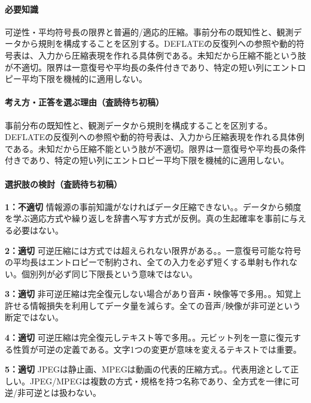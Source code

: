 \paragraph{必要知識} 可逆性・平均符号長の限界と普遍的/適応的圧縮。事前分布の既知性と、観測データから規則を構成することを区別する。DEFLATEの反復列への参照や動的符号表は、入力から圧縮表現を作れる具体例である。未知だから圧縮不能という肢が不適切。限界は一意復号や平均長の条件付きであり、特定の短い列にエントロピー平均下限を機械的に適用しない。

\paragraph{考え方・正答を選ぶ理由（査読待ち初稿）} 事前分布の既知性と、観測データから規則を構成することを区別する。DEFLATEの反復列への参照や動的符号表は、入力から圧縮表現を作れる具体例である。未知だから圧縮不能という肢が不適切。限界は一意復号や平均長の条件付きであり、特定の短い列にエントロピー平均下限を機械的に適用しない。

\paragraph{選択肢の検討（査読待ち初稿）}\mbox{}\par

\noindent\textbf{1：不適切} 情報源の事前知識がなければデータ圧縮できない。。データから頻度を学ぶ適応方式や繰り返しを辞書へ写す方式が反例。真の生起確率を事前に与える必要はない。\par

\noindent\textbf{2：適切} 可逆圧縮には方式では超えられない限界がある。。一意復号可能な符号の平均長はエントロピーで制約され、全ての入力を必ず短くする単射も作れない。個別列が必ず同じ下限長という意味ではない。\par

\noindent\textbf{3：適切} 非可逆圧縮は完全復元しない場合があり音声・映像等で多用。。知覚上許せる情報損失を利用してデータ量を減らす。全ての音声/映像が非可逆という断定ではない。\par

\noindent\textbf{4：適切} 可逆圧縮は完全復元しテキスト等で多用。。元ビット列を一意に復元する性質が可逆の定義である。文字1つの変更が意味を変えるテキストでは重要。\par

\noindent\textbf{5：適切} JPEGは静止画、MPEGは動画の代表的圧縮方式。。代表用途として正しい。JPEG/MPEGは複数の方式・規格を持つ名称であり、全方式を一律に可逆/非可逆とは扱わない。\par

